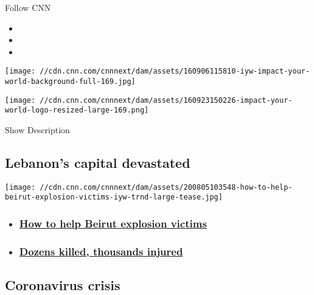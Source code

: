 Follow CNN

\begin{itemize}
\item
\item
\item
\end{itemize}

\texttt{[image: //cdn.cnn.com/cnnnext/dam/assets/160906115810-iyw-impact-your-world-background-full-169.jpg]}

\texttt{[image: //cdn.cnn.com/cnnnext/dam/assets/160923150226-impact-your-world-logo-resized-large-169.png]}

Show Description

\href{//twitter.com/cnnimpact}{}

\hypertarget{lebanons-capital-devastated-}{%
\subsection{Lebanon's capital
devastated~}\label{lebanons-capital-devastated-}}

\href{/2020/08/05/world/help-beirut-explosion-victims-iyw-trnd/index.html}{}

\texttt{[image: //cdn.cnn.com/cnnnext/dam/assets/200805103548-how-to-help-beirut-explosion-victims-iyw-trnd-large-tease.jpg]}

\begin{itemize}
\item
  \hypertarget{how-to-help-beirut-explosion-victims-}{%
  \subsubsection{\texorpdfstring{\href{/2020/08/05/world/help-beirut-explosion-victims-iyw-trnd/index.html}{How
  to help Beirut explosion victims
  }}{How to help Beirut explosion victims }}\label{how-to-help-beirut-explosion-victims-}}
\item
  \hypertarget{dozens-killed-thousands-injured}{%
  \subsubsection{\texorpdfstring{\href{/videos/world/2020/08/04/beirut-explosion-video-mss-orig.cnn}{Dozens
  killed, thousands
  injured}}{Dozens killed, thousands injured}}\label{dozens-killed-thousands-injured}}
\end{itemize}

\hypertarget{coronavirus-crisis-}{%
\subsection{Coronavirus crisis~}\label{coronavirus-crisis-}}

